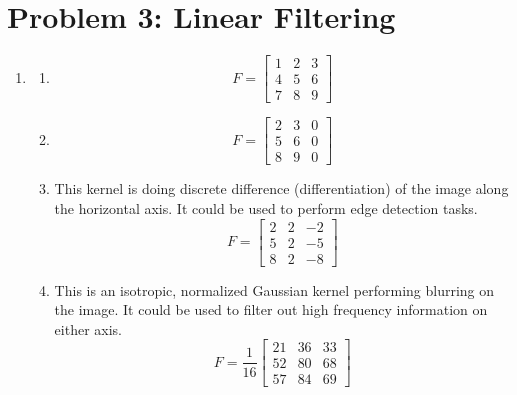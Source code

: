 \documentclass{article}
\begin{document}
\section*{Problem 3: Linear Filtering}
\begin{enumerate}[label=(\roman*)]
\item %

\begin{enumerate}
	\item
	\begin{equation}
	F = \begin{bmatrix}
	1 & 2 & 3 \\
	4 & 5 & 6 \\
	7 & 8 & 9
	\end{bmatrix}
	\end{equation}
	
	\item
	\begin{equation}
	F = \begin{bmatrix}
	2 & 3 & 0 \\
	5 & 6 & 0 \\
	8 & 9 & 0
	\end{bmatrix}
	\end{equation}
	
	\item
	This kernel is doing discrete difference (differentiation) of the image along the horizontal axis. It could be used to perform edge detection tasks.
	\begin{equation}
	F = \begin{bmatrix}
	2 & 2 & -2 \\
	5 & 2 & -5 \\
	8 & 2 & -8
	\end{bmatrix}
	\end{equation}
	
	\item
	This is an isotropic, normalized Gaussian kernel performing blurring on the image. It could be used to filter out high frequency information on either axis.
	\begin{equation}
	F = \frac{1}{16}\begin{bmatrix}
	21 & 36 & 33 \\
	52 & 80 & 68 \\
	57 & 84 & 69
	\end{bmatrix}
	\end{equation}
	
	
	
\end{enumerate}


\end{enumerate}
\end{document}
